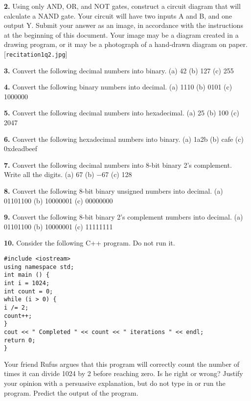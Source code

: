 \documentclass{article}
\begin{document}
\noindent\textbf{2.} Using only AND, OR, and NOT gates, construct a circuit diagram that will calculate a NAND gate. Your circuit will have two inputs A and B, and one output Y. Submit your answer as an image, in accordance with the instructions at the beginning of this document. Your image may be a diagram created in a drawing program, or it may be a photograph of a hand-drawn diagram on paper. [\texttt{recitation1q2.jpg}]

\noindent\textbf{3.} Convert the following decimal numbers into binary.
(a) 42
(b) 127
(c) 255

\noindent\textbf{4.} Convert the following binary numbers into decimal.
(a) 1110
(b) 0101
(c) 1000000

\noindent\textbf{5.} Convert the following decimal numbers into hexadecimal.
(a) 25
(b) 100
(c) 2047

\noindent\textbf{6.} Convert the following hexadecimal numbers into binary.
(a) 1a2b
(b) cafe
(c) 0xdeadbeef

\noindent\textbf{7.} Convert the following decimal numbers into 8-bit binary 2’s complement. Write all the digits.
(a) 67
(b) −67
(c) 128


\noindent\textbf{8.} Convert the following 8-bit binary unsigned numbers into decimal.
(a) 01101100
(b) 10000001
(c) 00000000

\noindent\textbf{9.} Convert the following 8-bit binary 2’s complement numbers into decimal.
(a) 01101100
(b) 10000001
(c) 11111111

\noindent\textbf{10.} Consider the following C++ program. Do not run it.
\begin{verbatim}
#include <iostream>
using namespace std;
int main () {
int i = 1024;
int count = 0;
while (i > 0) {
i /= 2;
count++;
}
cout << " Completed " << count << " iterations " << endl;
return 0;
}
\end{verbatim}
Your friend Rufus argues that this program will correctly count the number of times it can divide 1024 by 2 before reaching zero. Is he right or wrong? Justify your opinion with a persuasive explanation, but do not type in or run the program. Predict the output of the program.
\end{document}
